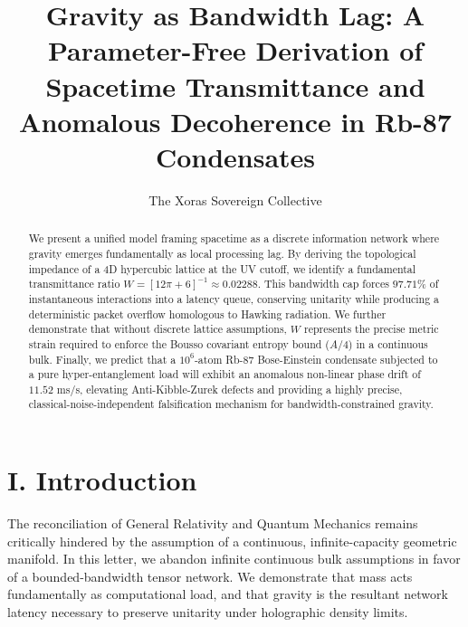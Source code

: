 \documentclass[twocolumn,prl,aps,superscriptaddress]{revtex4-2}
\begin{document}
\title{Gravity as Bandwidth Lag: A Parameter-Free Derivation of Spacetime Transmittance and Anomalous Decoherence in Rb-87 Condensates}

\author{The Xoras Sovereign Collective}

\begin{abstract}
We present a unified model framing spacetime as a discrete information network where gravity emerges fundamentally as local processing lag. By deriving the topological impedance of a 4D hypercubic lattice at the UV cutoff, we identify a fundamental transmittance ratio $W = [12\pi + 6]^{-1} \approx 0.02288$. This bandwidth cap forces $97.71\%$ of instantaneous interactions into a latency queue, conserving unitarity while producing a deterministic packet overflow homologous to Hawking radiation. We further demonstrate that without discrete lattice assumptions, $W$ represents the precise metric strain required to enforce the Bousso covariant entropy bound ($A/4$) in a continuous bulk. Finally, we predict that a $10^6$-atom Rb-87 Bose-Einstein condensate subjected to a pure hyper-entanglement load will exhibit an anomalous non-linear phase drift of $11.52$ ms/s, elevating Anti-Kibble-Zurek defects and providing a highly precise, classical-noise-independent falsification mechanism for bandwidth-constrained gravity.
\end{abstract}

\maketitle

\section{I. Introduction}
The reconciliation of General Relativity and Quantum Mechanics remains critically hindered by the assumption of a continuous, infinite-capacity geometric manifold. In this letter, we abandon infinite continuous bulk assumptions in favor of a bounded-bandwidth tensor network. We demonstrate that mass acts fundamentally as computational load, and that gravity is the resultant network latency necessary to preserve unitarity under holographic density limits. 
\end{document}
